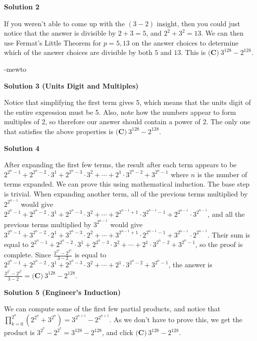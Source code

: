 \begin{enumerate}
 



\textbf{Solution 2}

If you weren't able to come up with the $(3 - 2)$ insight, then you could just notice that the answer is divisible by $2 + 3 = 5$, and $2^2 + 3^2 = 13$. We can then use Fermat's Little Theorem for $p = 5, 13$ on the answer choices to determine which of the answer choices are divisible by both $5$ and $13$. This is $\boxed{\textbf{(C)} ~3^{128}-2^{128}}$.

 -mewto

 



\textbf{Solution 3 (Units Digit and Multiples)}

Notice that simplifying the first term gives 5, which means that the units digit of the entire expression must be 5. Also, note how the numbers appear to form multiples of 2, so therefore our answer should contain a power of 2. The only one that satisfies the above properties is $\boxed{\textbf{(C)} ~3^{128}-2^{128}}$.

 



\textbf{Solution 4}

After expanding the first few terms, the result after each term appears to be $2^{2^n-1} + 2^{2^n-2}\cdot{3^1} + 2^{2^n-3}\cdot{3^2} + \cdots + 2^1\cdot{3^{2^n-2}} + 3^{2^n-1}$ where $n$ is the number of terms expanded. We can prove this using mathematical induction. The base step is trivial. When expanding another term, all of the previous terms multiplied by $2^{2^{n-1}}$ would give $2^{2^n-1} + 2^{2^n-2}\cdot{3^1} + 2^{2^n-3}\cdot{3^2} + \cdots + 2^{2^{n-1}+1}\cdot{3^{2^{n-1}-1}} + 2^{2^{n-1}}\cdot{3^{2^{n-1}}}$, and all the previous terms multiplied by $3^{2^{n-1}}$ would give $3^{2^n-1} + 3^{2^n-2}\cdot{2^1} + 3^{2^n-3}\cdot{2^2} + \cdots + 3^{2^{n-1}+1}\cdot{2^{2^{n-1}-1}} + 3^{2^{n-1}}\cdot{2^{2^{n-1}}}$. Their sum is equal to $2^{2^n-1} + 2^{2^n-2}\cdot{3^1} + 2^{2^n-3}\cdot{3^2} + \cdots + 2^1\cdot{3^{2^n-2}} + 3^{2^n-1}$, so the proof is complete. Since $\frac{3^{2^n}-2^{2^n}}{3-2}$ is equal to $2^{2^n-1} + 2^{2^n-2}\cdot{3^1} + 2^{2^n-3}\cdot{3^2} + \cdots + 2^1\cdot{3^{2^n-2}} + 3^{2^n-1}$, the answer is $\frac{3^{2^7}-2^{2^7}}{3-2}=\boxed{\textbf{(C)} ~3^{128}-2^{128}}$.

 



\textbf{Solution 5 (Engineer's Induction)}

We can compute some of the first few partial products, and notice that $\prod_{k = 0}^{2^n} (2^{2^n}+3^{2^n}) = 3^{2^{n+1}} - 2^{2^{n+1}}$. As we don't have to prove this, we get the product is $3^{2^7} - 2^{2^7} = 3^{128} - 2^{128}$, and click $\boxed{\textbf{(C)} ~3^{128}-2^{128}}$. 


\end{enumerate}
